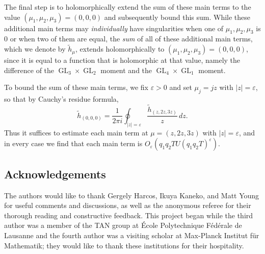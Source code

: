 \documentclass[11pt,a4paper]{amsart}
\newcommand{\e}{\varepsilon}
\DeclareMathOperator{\GL}{GL}
\numberwithin{equation}{section}
\theoremstyle{remark}
\theoremstyle{definition}
\begin{document}
The final step is to holomorphically extend the sum of these main terms to the value $(\mu_1,\mu_2,\mu_3) = (0,0,0)$ and subsequently bound this sum. While these additional main terms may \emph{individually} have singularities when one of $\mu_1,\mu_2,\mu_3$ is $0$ or when two of them are equal, the \emph{sum} of all of these additional main terms, which we denote by $\widetilde{h}_{\mu}$, extends holomorphically to $(\mu_1,\mu_2,\mu_3) = (0,0,0)$, since it is equal to a function that is holomorphic at that value, namely the difference of the $\GL_3 \times \GL_2$ moment and the $\GL_4 \times \GL_1$ moment.

To bound the sum of these main terms, we fix $\e > 0$ and set $\mu_j = jz$ with $|z| = \e$, so that by Cauchy's residue formula,
\[\widetilde{h}_{(0,0,0)} = \frac{1}{2\pi i} \oint_{|z| = \e} \frac{\widetilde{h}_{(z,2z,3z)}}{z} \, dz.\]
Thus it suffices to estimate each main term at $\mu = (z,2z,3z)$ with $|z| = \e$, and in every case we find that each main term is $O_{\e}(q_1 q_2 TU (q_1 q_2 T)^{\e})$.


{}
\hypersetup{bookmarksdepth=-1}


\subsection*{Acknowledgements}

The authors would like to thank Gergely Harcos, Ikuya Kaneko, and Matt Young for useful comments and discussions, as well as the anonymous referee for their thorough reading and constructive feedback. This project began while the third author was a member of the TAN group at \'{E}cole Polytechnique F\'{e}d\'{e}rale de Lausanne and the fourth author was a visiting scholar at Max-Planck Institut f\"{u}r Mathematik; they would like to thank these institutions for their hospitality.



\hypersetup{bookmarksdepth}
\end{document}

